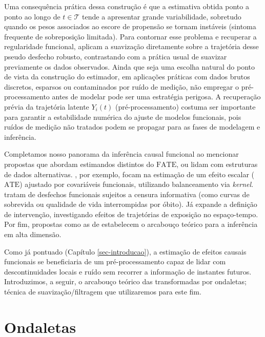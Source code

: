 Uma consequência prática dessa construção é que a estimativa obtida ponto a ponto ao longo de \(t \in \mathcal{T}\) tende a apresentar grande variabilidade, sobretudo quando os pesos associados ao escore de propensão se tornam instáveis (sintoma frequente de sobreposição limitada). 
Para contornar esse problema e recuperar a regularidade funcional,  aplicam a suavização diretamente sobre a trajetória desse pseudo desfecho robusto, contrastando com a prática usual de suavizar previamente os dados observados. 
Ainda que seja uma escolha natural do ponto de vista da construção do estimador, em aplicações práticas com dados brutos discretos, esparsos ou contaminados por ruído de medição, não empregar o pré-processamento antes de modelar pode ser uma estratégia perigosa. 
A recuperação prévia da trajetória latente \(Y_i(t)\) (pré-processamento) costuma ser importante para garantir a estabilidade numérica do ajuste de modelos funcionais, pois ruídos de medição não tratados podem se propagar para as fases de modelagem e inferência.

Completamos nosso panorama da inferência causal funcional ao mencionar propostas que abordam estimandos distintos do \(\mathrm{FATE}\), ou lidam com estruturas de dados alternativas. 
, por exemplo, focam na estimação de um efeito escalar (\(\mathrm{ATE}\)) ajustado por covariáveis funcionais, utilizando balanceamento via \emph{kernel}. 
 tratam de desfechos funcionais sujeitos a censura informativa (como curvas de sobrevida ou qualidade de vida interrompidas por óbito). 
Já  expande a definição de intervenção, investigando efeitos de trajetórias de exposição no espaço-tempo. 
Por fim, propostas como as de  estabelecem o arcabouço teórico para a inferência em alta dimensão.

Como já pontuado (Capítulo \ref{sec-introducao}), a estimação de efeitos causais funcionais se beneficiaria de um pré-processamento capaz de lidar com descontinuidades locais e ruído sem recorrer a informação de instantes futuros. 
Introduzimos, a seguir, o arcabouço teórico das transformadas por ondaletas; técnica de suavização/filtragem que utilizaremos para este fim.

\section{Ondaletas}

